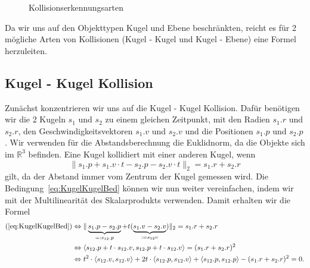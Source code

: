 \documentclass[a4paper, 10pt, openright, parskip, chapterprefix]{scrreprt}
\begin{document}
\begin{figure}[h!]
\centering{}
\caption{Kollisionserkennungsarten}
\label{abb:kollkondis}
\end{figure}

Da wir uns auf den Objekttypen Kugel und Ebene beschränkten, reicht es für 2 mögliche Arten von Kollisionen 
(Kugel - Kugel und Kugel - Ebene) eine Formel herzuleiten.\\

\subsection{Kugel - Kugel Kollision}
\noindent Zunächst konzentrieren wir uns auf die Kugel - Kugel Kollision. Dafür benötigen wir die 2 Kugeln 
$s_1$ und $s_2$ zu einem gleichen Zeitpunkt, mit den Radien $s_1.r$ und $s_2.r$, den Geschwindigkeitsvektoren
$s_1.v$ und $s_2.v$ und die Positionen $s_1.p$ und $s_2.p$. Wir verwenden für die Abstandsberechnung die
Euklidnorm, da die Objekte sich im $\mathbb{R}^{3}$ befinden. Eine Kugel kollidiert mit einer anderen
Kugel, wenn 
\begin{equation}
    \label{eq:KugelKugelBed}
    \|s_1.p + s_1.v \cdot t - s_2.p - s_2.v \cdot t \|_{2} = s_1.r + s_2.r
\end{equation}
gilt, da der Abstand immer vom Zentrum der Kugel gemessen wird.
Die Bedingung~\ref{eq:KugelKugelBed} können wir nun weiter vereinfachen, indem wir mit der Multilinearität des Skalarprodukts verwenden. Damit erhalten wir die Formel 
\begin{align*}
(\ref{eq:KugelKugelBed})  &\Leftrightarrow \|\underbrace{s_1.p - s_2.p}_{=: s_{12}.p} + t (\underbrace{s_1.v - s_2.v}_{:=s_{12}v})\|_{2}  = s_1.r + s_2.r\\
&\Leftrightarrow \langle s_{12}.p + t \cdot s_{12}.v, s_{12}.p + t \cdot s_{12}.v\rangle = (s_1.r + s_2.r)^{2}\\
&\Leftrightarrow t^{2} \cdot \langle s_{12}.v, s_{12}.v\rangle + 2t \cdot \langle s_{12}.p, s_{12}.v\rangle + \langle s_{12}.p, s_{12}.p\rangle -(s_1.r+s_2.r)^{2} = 0 \text{.}
\end{align*}
\end{document}
